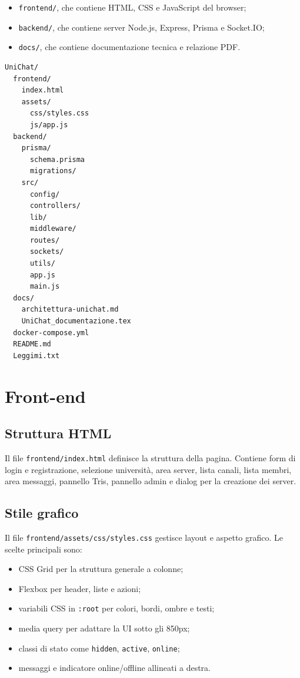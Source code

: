 \documentclass[11pt,a4paper]{article}
\begin{document}
\begin{itemize}
  \item \texttt{frontend/}, che contiene HTML, CSS e JavaScript del browser;
  \item \texttt{backend/}, che contiene server Node.js, Express, Prisma e Socket.IO;
  \item \texttt{docs/}, che contiene documentazione tecnica e relazione PDF.
\end{itemize}

\begin{verbatim}
UniChat/
  frontend/
    index.html
    assets/
      css/styles.css
      js/app.js
  backend/
    prisma/
      schema.prisma
      migrations/
    src/
      config/
      controllers/
      lib/
      middleware/
      routes/
      sockets/
      utils/
      app.js
      main.js
  docs/
    architettura-unichat.md
    UniChat_documentazione.tex
  docker-compose.yml
  README.md
  Leggimi.txt
\end{verbatim}

\section{Front-end}

\subsection{Struttura HTML}

Il file \texttt{frontend/index.html} definisce la struttura della pagina. Contiene form di login e registrazione, selezione università, area server, lista canali, lista membri, area messaggi, pannello Tris, pannello admin e dialog per la creazione dei server.

\subsection{Stile grafico}

Il file \texttt{frontend/assets/css/styles.css} gestisce layout e aspetto grafico. Le scelte principali sono:

\begin{itemize}
  \item CSS Grid per la struttura generale a colonne;
  \item Flexbox per header, liste e azioni;
  \item variabili CSS in \texttt{:root} per colori, bordi, ombre e testi;
  \item media query per adattare la UI sotto gli 850px;
  \item classi di stato come \texttt{hidden}, \texttt{active}, \texttt{online};
  \item messaggi e indicatore online/offline allineati a destra.
\end{itemize}
\end{document}
